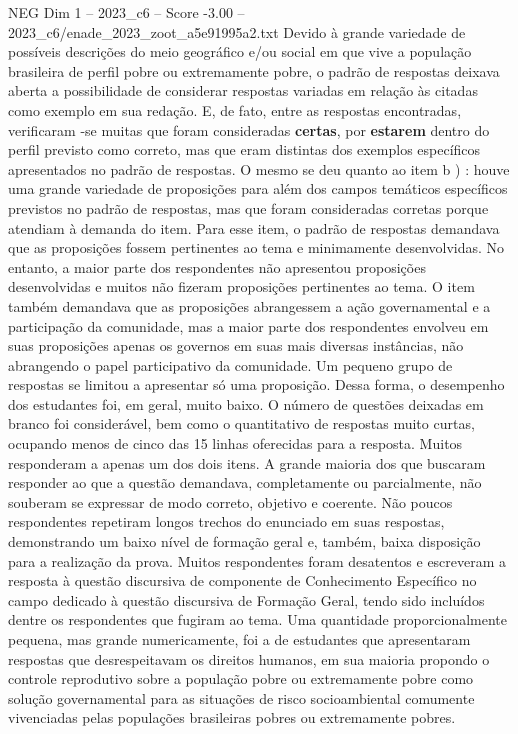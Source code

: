 \begin{textsample}{NEG Dim 1 – 2023\_c6 – Score -3.00 – 2023\_c6/enade\_2023\_zoot\_a5e91995a2.txt}
Devido à grande variedade de possíveis descrições do meio geográfico e/ou social em que vive a população brasileira de perfil pobre ou extremamente pobre, o padrão de respostas deixava aberta a possibilidade de considerar respostas variadas em relação às citadas como exemplo em sua redação.
E, de fato, entre as respostas encontradas, verificaram -se muitas que foram consideradas \textbf{certas}, por \textbf{estarem} dentro do perfil previsto como correto, mas que eram distintas dos exemplos específicos apresentados no padrão de respostas.
O mesmo se deu quanto ao item b ) : houve uma grande variedade de proposições para além dos campos temáticos específicos previstos no padrão de respostas, mas que foram consideradas corretas porque atendiam à demanda do item.
Para esse item, o padrão de respostas demandava que as proposições fossem pertinentes ao tema e minimamente desenvolvidas.
No entanto, a maior parte dos respondentes não apresentou proposições desenvolvidas e muitos não fizeram proposições pertinentes ao tema.
O item também demandava que as proposições abrangessem a ação governamental e a participação da comunidade, mas a maior parte dos respondentes envolveu em suas proposições apenas os governos em suas mais diversas instâncias, não abrangendo o papel participativo da comunidade.
Um pequeno grupo de respostas se limitou a apresentar só uma proposição.
Dessa forma, o desempenho dos estudantes foi, em geral, muito baixo.
O número de questões deixadas em branco foi considerável, bem como o quantitativo de respostas muito curtas, ocupando menos de cinco das 15 linhas oferecidas para a resposta.
Muitos responderam a apenas um dos dois itens.
A grande maioria dos que buscaram responder ao que a questão demandava, completamente ou parcialmente, não souberam se expressar de modo correto, objetivo e coerente.
Não poucos respondentes repetiram longos trechos do enunciado em suas respostas, demonstrando um baixo nível de formação geral e, também, baixa disposição para a realização da prova.
Muitos respondentes foram desatentos e escreveram a resposta à questão discursiva de componente de Conhecimento Específico no campo dedicado à questão discursiva de Formação Geral, tendo sido incluídos dentre os respondentes que fugiram ao tema.
Uma quantidade proporcionalmente pequena, mas grande numericamente, foi a de estudantes que apresentaram respostas que desrespeitavam os direitos humanos, em sua maioria propondo o controle reprodutivo sobre a população pobre ou extremamente pobre como solução governamental para as situações de risco socioambiental comumente vivenciadas pelas populações brasileiras pobres ou extremamente pobres.

\end{textsample}
